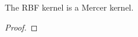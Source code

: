 \begin{theorem}
    The RBF kernel is a Mercer kernel.
\end{theorem}
\begin{proof}
    
\end{proof}
%
%
%
